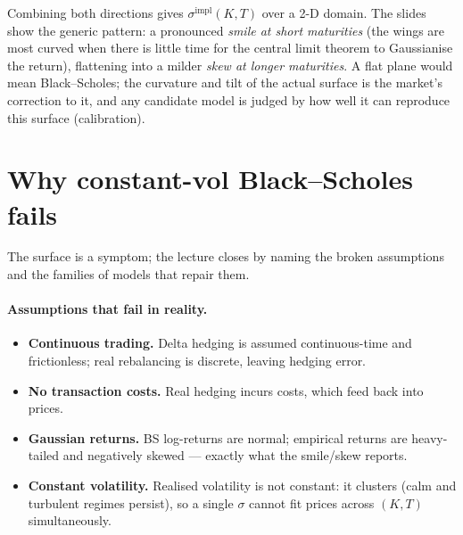 \documentclass[11pt]{article}
\newcommand{\impl}{\mathrm{impl}}
\begin{document}
Combining both directions gives $\sigma^{\impl}(K,T)$ over a 2-D domain. The slides show the
generic pattern: a pronounced \emph{smile at short maturities} (the wings are most curved when
there is little time for the central limit theorem to Gaussianise the return), flattening into a
milder \emph{skew at longer maturities}. A flat plane would mean Black--Scholes; the curvature and
tilt of the actual surface is the market's correction to it, and any candidate model is judged by
how well it can reproduce this surface (calibration).

\section{Why constant-vol Black--Scholes fails}

The surface is a symptom; the lecture closes by naming the broken assumptions and the families of
models that repair them.

\paragraph{Assumptions that fail in reality.}
\begin{itemize}[nosep]
\item \textbf{Continuous trading.} Delta hedging is assumed continuous-time and frictionless; real
      rebalancing is discrete, leaving hedging error.
\item \textbf{No transaction costs.} Real hedging incurs costs, which feed back into prices.
\item \textbf{Gaussian returns.} BS log-returns are normal; empirical returns are heavy-tailed and
      negatively skewed --- exactly what the smile/skew reports.
\item \textbf{Constant volatility.} Realised volatility is not constant: it clusters (calm and
      turbulent regimes persist), so a single $\sigma$ cannot fit prices across $(K,T)$
      simultaneously.
\end{itemize}
\end{document}
